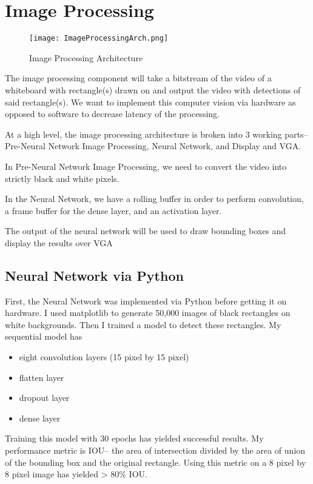 \section{Image Processing}
\begin{figure}[htbp]
\texttt{[image: ImageProcessingArch.png]}
\caption{Image Processing Architecture}
\label{fig}
\end{figure}

The image processing component will take a bitstream of the video of a whiteboard with rectangle(s) drawn on and output the video with detections of said rectangle(s). We want to implement this computer vision via hardware as opposed to software to decrease latency of the processing.

At a high level, the image processing architecture is broken into 3 working parts-- Pre-Neural Network Image Processing, Neural Network, and Display and VGA.

In Pre-Neural Network Image Processing, we need to convert the video into strictly black and white pixels.

In the Neural Network, we have a rolling buffer in order to perform convolution, a frame buffer for the dense layer, and an activation layer.

The output of the neural network will be used to draw bounding boxes and display the results over VGA

\subsection{Neural Network via Python}\label{AA}
First, the Neural Network was implemented via Python before getting it on hardware. I used matplotlib to generate 50,000 images of black rectangles on white backgrounds. Then I trained a model to detect these rectangles. My sequential model has
\begin{itemize}
\item eight convolution layers (15 pixel by 15 pixel)
\item flatten layer
\item dropout layer
\item dense layer
\end{itemize}

Training this model with 30 epochs has yielded successful results. My performance metric is IOU-- the area of intersection divided by the area of union of the bounding box and the original rectangle. Using this metric on a 8 pixel by 8 pixel image has yielded > 80\% IOU. 

